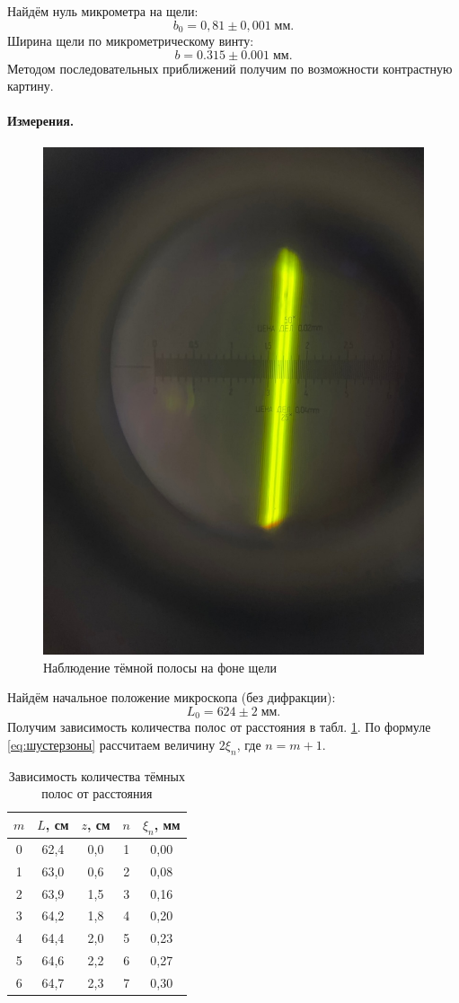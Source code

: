 \documentclass[a4paper, 12pt]{article}
\begin{document}
Найдём нуль микрометра на щели:
\begin{equation*}\label{key}
	 b_0 = 0,81 \pm 0,001 \; мм.
\end{equation*}
Ширина щели по микрометрическому винту:
\begin{equation*}\label{key}
	b = 0.315 \pm 0.001 \; мм.
\end{equation*}
Методом последовательных приближений получим по возможности контрастную картину.

\paragraph{Измерения.}

\begin{figure}[h!]
	\centering
	\includegraphics[width=0.5\linewidth]{frenel.jpg}
	\caption{Наблюдение тёмной полосы на фоне щели}
	\label{fig:1полоса}
\end{figure}

Найдём начальное положение микроскопа (без дифракции):
\begin{equation*}\label{key}
	L_0 = 624 \pm 2\; мм.
\end{equation*}
Получим зависимость количества полос от расстояния в табл. \ref{tab:Френель}. По формуле \eqref{eq:шустерзоны} рассчитаем величину $2\xi_n$, где $n = m + 1$. 
\begin{table}[h!]
	\centering
	\begin{tabular}{|c|c|c|c|c|}
    \hline
    $m$ & $L$, см & $z$, см & $n$ & $\xi_n$, мм \\ \hline
    0 & 62,4  & 0,0   & 1 & 0,00       \\ \hline
    1 & 63,0  & 0,6   & 2 & 0,08       \\ \hline
    2 & 63,9  & 1,5   & 3 & 0,16       \\ \hline
    3 & 64,2  & 1,8   & 4 & 0,20       \\ \hline
    4 & 64,4  & 2,0   & 5 & 0,23       \\ \hline
    5 & 64,6  & 2,2   & 6 & 0,27       \\ \hline
    6 & 64,7  & 2,3   & 7 & 0,30       \\ \hline
    \end{tabular}
    \caption{Зависимость количества тёмных полос от расстояния}
	\label{tab:Френель}
\end{table}
\end{document}

